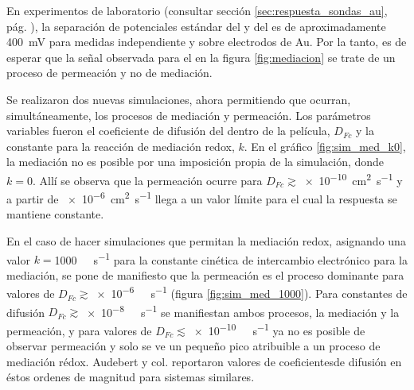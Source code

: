 		En experimentos de laboratorio (consultar sección \ref{sec:respuesta_sondas_au}, pág. \pageref{sec:respuesta_sondas_au}), la separación de potenciales estándar del \ru\space y del \fc\space es de aproximadamente \SI{400}{\milli\volt} para medidas independiente y sobre electrodos de Au. Por la tanto, es de esperar que la señal observada para el \fc\space en la figura \ref{fig:mediacion} se trate de un proceso de permeación y no de mediación.

		Se realizaron dos nuevas simulaciones, ahora permitiendo que ocurran, simultáneamente, los procesos de mediación y permeación. Los parámetros variables fueron el coeficiente de difusión del \fc\space dentro de la película, $D_{Fc}$ y la constante para la reacción de mediación redox, $k$. En el gráfico \ref{fig:sim_med_k0}, la mediación no es posible por una imposición propia de la simulación, donde $k\!=\!0$. Allí se observa que la permeación ocurre para $D_{Fc}\!\!\gtrsim$\SI{e-10}{\square\cm\per\second} y a partir de \SI{e-6}{\square\cm\per\second} llega a un valor límite para el cual la respuesta se mantiene constante.

		En el caso de hacer simulaciones que permitan la mediación redox, asignando una valor $k\!=$\SI{1000}{\per\Molar\per\second} para la constante cinética de intercambio electrónico para la mediación, se pone de manifiesto que la permeación es el proceso dominante para valores de $D_{Fc}\!\gtrsim$\SI{e-6}{\per\Molar\per\second} (figura \ref{fig:sim_med_1000}). Para constantes de difusión $D_{Fc}\!\gtrsim$\SI{e-8}{\per\Molar\per\second} se manifiestan ambos procesos, la mediación y la permeación, y para valores de $D_{Fc}\!\lesssim$\SI{e-10}{\per\Molar\per\second} ya no es posible de observar permeación y solo se ve un pequeño pico atribuible a un proceso de mediación rédox. Audebert y col. reportaron valores de coeficientesde difusión en éstos ordenes de magnitud para sistemas similares\cite{Audebert2015}. 

